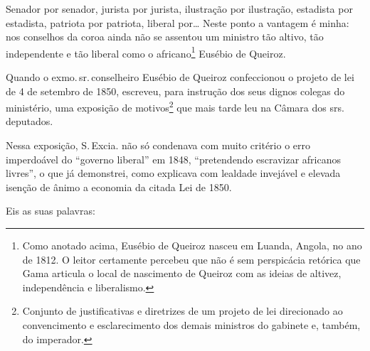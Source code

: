 Senador por senador, jurista por jurista, ilustração por ilustração,
estadista por estadista, patriota por patriota, liberal por\ldots{} Neste
ponto a vantagem é minha: nos conselhos da coroa ainda não se assentou
um ministro tão altivo, tão independente e tão liberal como o
africano\footnote{Como anotado acima, Eusébio de Queiroz nasceu em
  Luanda, Angola, no ano de 1812. O leitor certamente percebeu que não é
  sem perspicácia retórica que Gama articula o local de nascimento de
  Queiroz com as ideias de altivez, independência e liberalismo.}
Eusébio de Queiroz.

Quando o exmo.\,sr.\,conselheiro Eusébio de Queiroz confeccionou o projeto
de lei de 4 de setembro de 1850, escreveu, para instrução dos seus
dignos colegas do ministério, uma exposição de motivos\footnote{
  Conjunto de justificativas e diretrizes de um projeto de lei
  direcionado ao convencimento e esclarecimento dos demais ministros do
  gabinete e, também, do imperador.} que mais tarde leu na Câmara dos
srs.\,deputados.

Nessa exposição, S.\,Excia. não só condenava com muito critério o erro
imperdoável do ``governo liberal'' em 1848, ``pretendendo escravizar
africanos livres'', o que já demonstrei, como explicava com lealdade
invejável e elevada isenção de ânimo a economia da citada Lei de 1850.

Eis as suas palavras:

